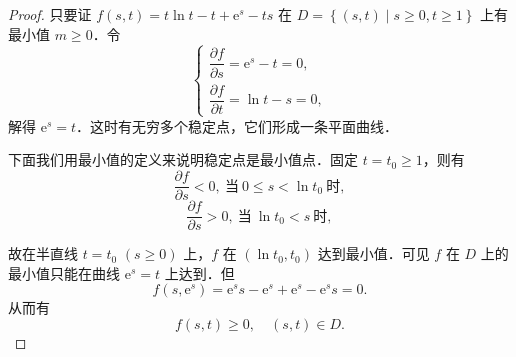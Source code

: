 \begin{proof}
只要证 $f(s,t)=t\ln t-t+\mathrm{e}^{s}-ts$ 在 $D=\left\{(s,t)\mid s\geqslant0,t\geqslant1\right\}$ 上有最小值 $m\geqslant0$．令
\[
\begin{cases}
\dfrac{\partial f}{\partial s}=\mathrm{e}^{s}-t=0,\\[2mm]
\dfrac{\partial f}{\partial t}=\ln t-s=0,
\end{cases}
\]
解得 $\mathrm{e}^{s}=t$．这时有无穷多个稳定点，它们形成一条平面曲线．

下面我们用最小值的定义来说明稳定点是最小值点．固定 $t=t_{0}\geqslant1$，则有
\[
\frac{\partial f}{\partial s}<0,\ \text{当}\ 0\leqslant s<\ln t_{0}\ \text{时},
\]
\[
\frac{\partial f}{\partial s}>0,\ \text{当}\ \ln t_{0}<s\ \text{时},
\]

\begin{figure}[htbp]
\centering
{}\caption{\relax}\label{fig:18-6}
\end{figure}

故在半直线 $t=t_{0}$ $(s\geqslant0)$ 上，$f$ 在 $(\ln t_{0},t_{0})$ 达到最小值．可见 $f$ 在 $D$ 上的最小值只能在曲线 $\mathrm{e}^{s}=t$ 上达到．但
\[
f(s,\mathrm{e}^{s})=\mathrm{e}^{s}s-\mathrm{e}^{s}+\mathrm{e}^{s}-\mathrm{e}^{s}s=0.
\]
从而有
\[
f(s,t)\geqslant0,\quad(s,t)\in D.
\]
\end{proof}

